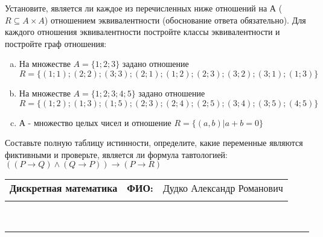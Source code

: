 \documentclass[10pt]{exam}
\newcommand{\class}{Дискретная математика}
\newcommand{\examdate}{}
\begin{document}
\begin{questions}
\question
Установите, является ли каждое из перечисленных ниже отношений на А ($R \subseteq A \times A$) отношением эквивалентности (обоснование ответа обязательно). Для каждого отношения эквивалентности постройте классы 
эквивалентности и постройте граф отношения:
\begin{enumerate} [a)]\setcounter{enumi}{0}
\item На множестве $A = \{1; 2; 3\}$ задано отношение $R = \{(1; 1); (2; 2); (3; 3); (2; 1); (1; 2); (2; 3); (3; 2); (3; 1); (1; 3)\}$
\item На множестве $A = \{1; 2; 3; 4; 5\}$ задано отношение $R = \{(1; 2); (1; 3); (1; 5); (2; 3); (2; 4); (2; 5); (3; 4); (3; 5); (4; 5)\}$
\item А - множество целых чисел и отношение $R = \{(a,b)|a + b = 0\}$
\end{enumerate}\question Составьте полную таблицу истинности, определите, какие переменные являются фиктивными и проверьте, является ли формула тавтологией:
$(( P \rightarrow Q) \land (Q \rightarrow P)) \rightarrow (P \rightarrow R)$

\end{questions}
\newpage
\begin{flushright}
\begin{tabular}{p{2.8in} r l}
\textbf{\class} & \textbf{ФИО:} &Дудко Александр Романович
\\

\textbf{\examdate} &&\\
\end{tabular}\\
\end{flushright}
\rule[1ex]{\textwidth}{.1pt}
\end{document}

